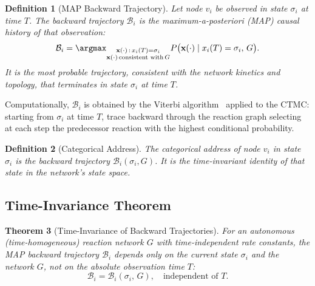 \documentclass[twocolumn,10pt,a4paper]{article}
\newcommand{\Back}{\mathcal{B}}
\newtheorem{theorem}{Theorem}[section]
\newtheorem{definition}[theorem]{Definition}
\begin{document}
\begin{definition}[MAP Backward Trajectory]
\label{def:backward-traj}
Let node $v_i$ be observed in state $\sigma_i$ at time $T$.  The
\emph{backward trajectory} $\Back_i$ is the maximum-a-posteriori (MAP) causal
history of that observation:
\begin{equation}
  \Back_i = \argmax_{\substack{\mathbf{x}(\cdot)\,:\,x_i(T)=\sigma_i\\
    \mathbf{x}(\cdot)\,\text{consistent with}\,G}}
  P\bigl(\mathbf{x}(\cdot)\mid x_i(T)=\sigma_i,\,G\bigr).
  \label{eq:backward-traj}
\end{equation}
It is the most probable trajectory, consistent with the network kinetics and
topology, that terminates in state $\sigma_i$ at time $T$.
\end{definition}

Computationally, $\Back_i$ is obtained by the Viterbi
algorithm~\cite{Viterbi1967,Forney1973} applied to the CTMC: starting from
$\sigma_i$ at time $T$, trace backward through the reaction graph selecting
at each step the predecessor reaction with the highest conditional probability.

\begin{definition}[Categorical Address]
\label{def:cat-address}
The \emph{categorical address} of node $v_i$ in state $\sigma_i$ is the
backward trajectory $\Back_i(\sigma_i,G)$.  It is the time-invariant identity
of that state in the network's state space.
\end{definition}

\subsection{Time-Invariance Theorem}
\label{sec:backward-timeinv}

\begin{theorem}[Time-Invariance of Backward Trajectories]
\label{thm:timeinv}
For an autonomous (time-homogeneous) reaction network $G$ with time-independent
rate constants, the MAP backward trajectory $\Back_i$ depends only on the
current state $\sigma_i$ and the network $G$, not on the absolute observation
time $T$:
\begin{equation}
  \Back_i = \Back_i(\sigma_i,\,G),\quad\text{independent of }T.
  \label{eq:timeinv}
\end{equation}
\end{theorem}
\end{document}
